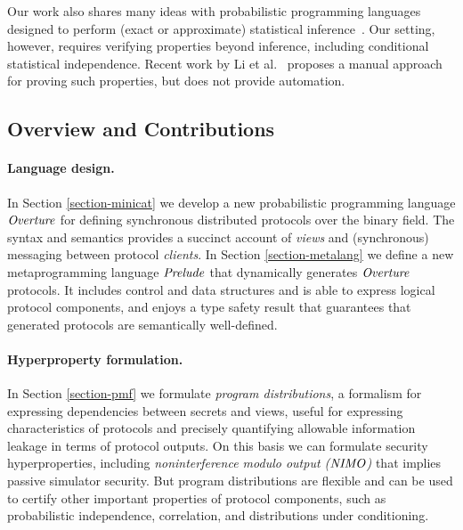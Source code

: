 Our work also shares many ideas with probabilistic programming
languages designed to perform (exact or approximate) statistical
inference~\cite{holtzen2020scaling, carpenter2017stan, wood2014new,
  bingham2019pyro, albarghouthi2017fairsquare, de2007problog,
  pfeffer2009figaro, saad2021sppl}. Our setting, however, requires
verifying properties beyond inference, including conditional
statistical independence. Recent work by Li et al.~\cite{li2023lilac} proposes a
manual approach for proving such properties, but does not provide
automation.

\subsection{Overview and Contributions}

\paragraph{Language design.} In Section \ref{section-minicat} we
develop a new probabilistic programming language $\mathit{Overture}$ for
defining synchronous distributed protocols over the binary field. The
syntax and semantics provides a succinct account of \emph{views} and
(synchronous) messaging between protocol \emph{clients}. In Section
\ref{section-metalang} we define a new metaprogramming language
$\mathit{Prelude}$ that dynamically generates $\mathit{Overture}$ protocols. It
includes control and data structures and is able to express logical
protocol components, and enjoys a type safety result that guarantees
that generated protocols are semantically well-defined.

\paragraph{Hyperproperty formulation.} In Section \ref{section-pmf} we
formulate \emph{program distributions}, a formalism for expressing
dependencies between secrets and views, useful for expressing
characteristics of protocols and precisely quantifying allowable
information leakage in terms of protocol outputs. On this basis we can
formulate security hyperproperties, including \emph{noninterference
modulo output ($\mathit{NIMO}$)} that implies passive simulator security. But
program distributions are flexible and can be used to certify other
important properties of protocol components, such as probabilistic
independence, correlation, and distributions under conditioning.

